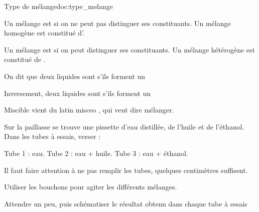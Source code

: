 \begin{doc}{Type de mélange}{doc:type_melange}
  \begin{encart}
    Un mélange est  si on ne peut pas distinguer ses constituants.
    Un mélange homogène est constitué d'.
  \end{encart}
  
  \begin{encart}
    Un mélange est  si on peut distinguer ses constituants.
    Un mélange hétérogène est constitué de .
  \end{encart}

  \begin{encart}
    On dit que deux liquides sont  s'ils forment un 
  \end{encart}
  \begin{encart}
    Inversement, deux liquides sont  s'ils forment un 
  \end{encart}
  Miscible vient du latin \og misceo \fg, qui veut dire mélanger.
\end{doc}


\mesure
Sur la paillasse se trouve une pissette d'eau distillée, de l'huile et de l'éthanol.
Dans les tubes à essais, verser :
\vspace*{-8pt}
\begin{center}
  \pointCyan Tube 1 : eau.
  \pointCyan Tube 2 : eau + huile.
  \pointCyan Tube 3 : eau + éthanol.
\end{center}
\vspace*{-8pt}
\attention Il faut faire attention à ne pas remplir les tubes, quelques centimètres suffisent.

\mesure 
Utiliser les bouchons pour agiter les différents mélanges.

%
\numeroQuestion
Attendre un peu, puis schématiser le résultat obtenu dans chaque tube à essais

%
\vspace{5cm}

%
  

